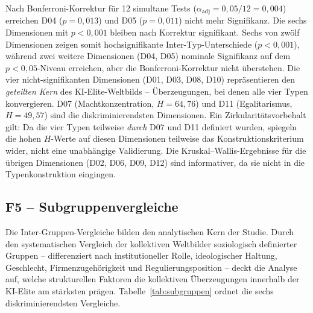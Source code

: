 \documentclass[12pt,a4paper]{article}
\begin{document}
Nach Bonferroni-Korrektur für 12 simultane Tests ($\alpha_{\mathrm{adj}} = 0{,}05/12 = 0{,}004$) erreichen D04 ($p = 0{,}013$) und D05 ($p = 0{,}011$) nicht mehr Signifikanz. Die sechs Dimensionen mit $p < 0{,}001$ bleiben nach Korrektur signifikant. Sechs von zwölf Dimensionen zeigen somit hochsignifikante Inter-Typ-Unterschiede ($p < 0{,}001$), während zwei weitere Dimensionen (D04, D05) nominale Signifikanz auf dem $p < 0{,}05$-Niveau erreichen, aber die Bonferroni-Korrektur nicht überstehen. Die vier nicht-signifikanten Dimensionen (D01, D03, D08, D10) repräsentieren den \emph{geteilten Kern} des KI-Elite-Weltbilds -- Überzeugungen, bei denen alle vier Typen konvergieren. D07 (Machtkonzentration, $H = 64{,}76$) und D11 (Egalitarismus, $H = 49{,}57$) sind die diskriminierendsten Dimensionen. Ein Zirkularitätsvorbehalt gilt: Da die vier Typen teilweise \emph{durch} D07 und D11 definiert wurden, spiegeln die hohen $H$-Werte auf diesen Dimensionen teilweise das Konstruktionskriterium wider, nicht eine unabhängige Validierung. Die Kruskal--Wallis-Ergebnisse für die übrigen Dimensionen (D02, D06, D09, D12) sind informativer, da sie nicht in die Typenkonstruktion eingingen.


\subsection{F5 -- Subgruppenvergleiche}
\label{sec:ergebnisse:f5}

Die Inter-Gruppen-Vergleiche bilden den analytischen Kern der Studie. Durch den systematischen Vergleich der kollektiven Weltbilder soziologisch definierter Gruppen -- differenziert nach institutioneller Rolle, ideologischer Haltung, Geschlecht, Firmenzugehörigkeit und Regulierungsposition -- deckt die Analyse auf, welche strukturellen Faktoren die kollektiven Überzeugungen innerhalb der KI-Elite am stärksten prägen. Tabelle~\ref{tab:subgruppen} ordnet die sechs diskriminierendsten Vergleiche.
\end{document}
